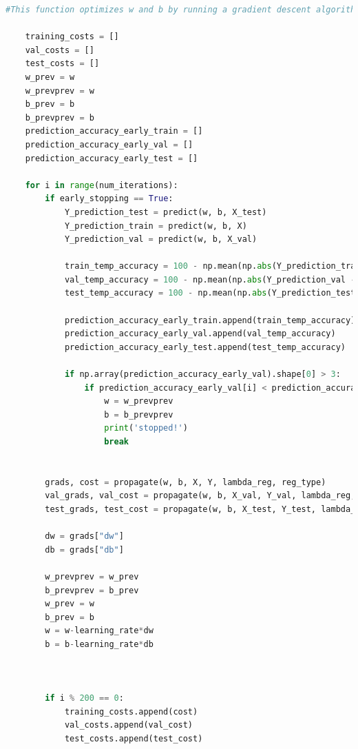 \documentclass{article} %
\begin{document}
{\begin{lstlisting}[language=Python]
    #This function optimizes w and b by running a gradient descent algorithm
    
    training_costs = []
    val_costs = []
    test_costs = []
    w_prev = w
    w_prevprev = w
    b_prev = b
    b_prevprev = b
    prediction_accuracy_early_train = []
    prediction_accuracy_early_val = []
    prediction_accuracy_early_test = []

    for i in range(num_iterations):
        if early_stopping == True:
            Y_prediction_test = predict(w, b, X_test)
            Y_prediction_train = predict(w, b, X)
            Y_prediction_val = predict(w, b, X_val)
            
            train_temp_accuracy = 100 - np.mean(np.abs(Y_prediction_train - Y)) * 100;
            val_temp_accuracy = 100 - np.mean(np.abs(Y_prediction_val - Y_val)) * 100;
            test_temp_accuracy = 100 - np.mean(np.abs(Y_prediction_test - Y_test)) * 100;
            
            prediction_accuracy_early_train.append(train_temp_accuracy)
            prediction_accuracy_early_val.append(val_temp_accuracy)
            prediction_accuracy_early_test.append(test_temp_accuracy)
            
            if np.array(prediction_accuracy_early_val).shape[0] > 3:
                if prediction_accuracy_early_val[i] < prediction_accuracy_early_val[i-1] and prediction_accuracy_early_val[i-1] < prediction_accuracy_early_val[i-2] and prediction_accuracy_early_val[i-2] < prediction_accuracy_early_val[i-3]:
                    w = w_prevprev
                    b = b_prevprev
                    print('stopped!')
                    break
    
        
        grads, cost = propagate(w, b, X, Y, lambda_reg, reg_type)
        val_grads, val_cost = propagate(w, b, X_val, Y_val, lambda_reg, reg_type)
        test_grads, test_cost = propagate(w, b, X_test, Y_test, lambda_reg, reg_type)
        
        dw = grads["dw"]
        db = grads["db"]
        
        w_prevprev = w_prev
        b_prevprev = b_prev
        w_prev = w
        b_prev = b
        w = w-learning_rate*dw
        b = b-learning_rate*db           
        
        

        if i % 200 == 0:
            training_costs.append(cost)
            val_costs.append(val_cost)
            test_costs.append(test_cost)
        

\end{lstlisting}}
\end{document}
